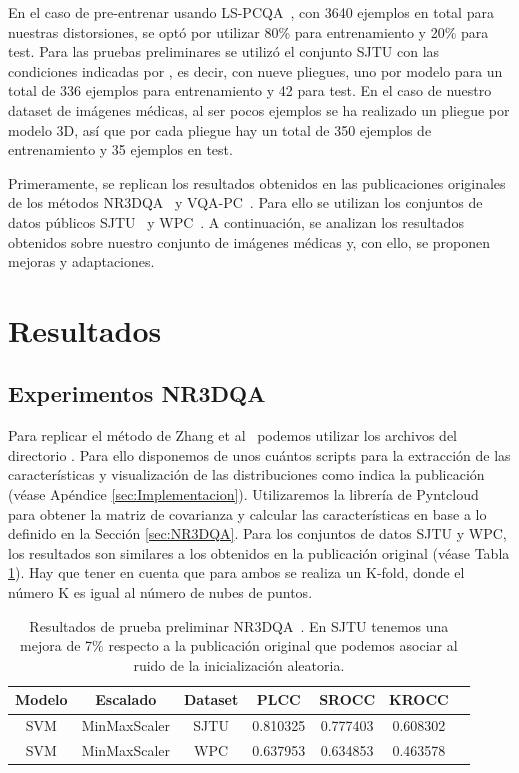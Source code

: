 En el caso de pre-entrenar usando LS-PCQA~\cite{ResSCNN}, con 3640 ejemplos en total para 
nuestras distorsiones, se optó por utilizar 80\% para entrenamiento y 20\% para test. 
Para las pruebas preliminares se utilizó el conjunto SJTU con las condiciones indicadas por 
\cite{VQA-PC}, es decir, con nueve pliegues, uno por modelo para un total de 336 ejemplos para entrenamiento y 42 para test. 
En el caso de nuestro dataset de imágenes médicas, al ser pocos ejemplos 
se ha realizado un pliegue por modelo 3D, así que por cada pliegue hay un total de 
350 ejemplos de entrenamiento y 35 ejemplos en test. 

Primeramente, se replican los resultados obtenidos en las publicaciones originales 
de los métodos NR3DQA~\cite{NR3DQA} y VQA-PC~\cite{VQA-PC}. Para ello se utilizan
los conjuntos de datos públicos SJTU~\cite{SJTU} y WPC~\cite{WPC1,WPC2}. 
A continuación, se analizan los resultados obtenidos sobre nuestro conjunto 
de imágenes médicas y, con ello, se proponen mejoras y adaptaciones.

\section{Resultados}
\subsection{Experimentos NR3DQA}
Para replicar el método de Zhang et al~\cite{NR3DQA} podemos utilizar los 
archivos del directorio . Para ello disponemos de unos cuántos scripts para la extracción de las características y visualización de las distribuciones 
como indica la publicación (véase Apéndice \ref{sec:Implementacion}). 
Utilizaremos la librería de Pyntcloud~\cite{Pyntcloud} para obtener 
la matriz de covarianza y calcular las características en base a lo definido 
en la Sección \ref{sec:NR3DQA}.
Para los conjuntos de datos SJTU y WPC, los resultados 
son similares a los obtenidos en la publicación original (véase Tabla \ref{tab:PlainNR3DQA}).
Hay que tener en cuenta que para ambos se realiza un K-fold, donde el número 
K es igual al número de nubes de puntos.

\begin{table}[htp]
  \scriptsize
  \begin{center}
    \begin{tabular}[c]{|c|c|c|c|c|c|c|}
      \hline
      \rowcolor[HTML]{FFC702}
      \textbf{Modelo} & \textbf{Escalado} & \textbf{Dataset} & \textbf{PLCC} & \textbf{SROCC} & \textbf{KROCC} \\ 
      \hline
      SVM & MinMaxScaler & SJTU & 0.810325 & 0.777403 & 0.608302 \\ 
      \hline 
      SVM & MinMaxScaler & WPC & 0.637953 & 0.634853 & 0.463578 \\
      \hline
    \end{tabular}
  \end{center}
  \caption[Resultados de prueba preliminar NR3DQA.]{Resultados de prueba preliminar NR3DQA~\cite{NR3DQA}.
  En SJTU tenemos una mejora de 7\% respecto a la publicación original que podemos asociar al ruido de la inicialización aleatoria. }
  \label{tab:PlainNR3DQA}
\end{table}

